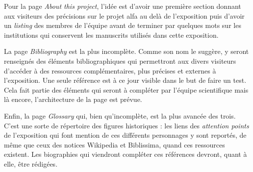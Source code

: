     Pour la page \textit{About this project}, l'idée est d'avoir une première section donnant aux visiteurs des précisions sur le projet \acrshort{alfa} au delà de l'exposition puis d'avoir un \textit{listing} des membres de l'équipe avant de terminer par quelques mots sur les institutions qui conservent les manuscrits utilisés dans cette exposition. 
    
    La page \textit{Bibliography} est la plus incomplète. Comme son nom le suggère, y seront renseignés des éléments bibliographiques qui permettront aux divers visiteurs d'accéder à des ressources complémentaires, plus précises et externes à l'exposition. Une seule référence est à ce jour visible dans le but de faire un test. Cela fait partie des éléments qui seront à compléter par l'équipe scientifique mais là encore, l'architecture de la page est prévue.
    
    Enfin, la page \textit{Glossary} qui, bien qu'incomplète, est la plus avancée des trois. C'est une sorte de répertoire des figures historiques : les liens des \textit{attention points} de l'exposition qui font mention de ces différents personnages y sont reportés, de même que ceux des notices Wikipedia et Biblissima, quand ces ressources existent. Les biographies qui viendront compléter ces références devront, quant à elle, être rédigées.
    
